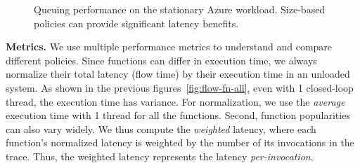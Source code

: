 \begin{figure}
  \centering
  \hfill
  \hfill
  \caption{Queuing performance on the stationary Azure workload. Size-based policies can provide significant latency benefits.}
  \label{fig:q-baseline}
\end{figure}


\noindent \textbf{Metrics.} 
We use multiple performance metrics to understand and compare different policies.
Since functions can differ in execution time, we always normalize their total latency (flow time) by their execution time in an unloaded system. 
As shown in the previous figures~\ref{fig:flow-fn-all}, even with 1 closed-loop thread, the execution time has variance.
For normalization, we use the \emph{average} execution time with 1 thread for all the functions. 
Second, function popularities can also vary widely. 
We thus compute the \emph{weighted} latency, where each function's normalized latency is weighted by the number of its invocations in the trace.
Thus, the weighted latency represents the latency \emph{per-invocation}. 


